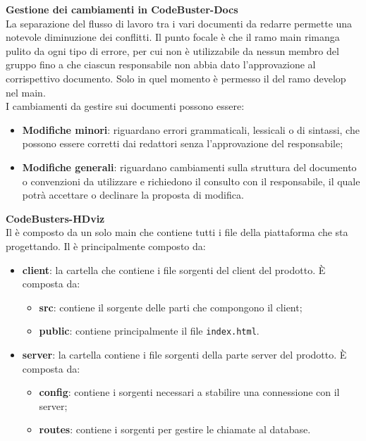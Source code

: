 \mbox{}	
	
\textbf{Gestione dei cambiamenti in CodeBuster-Docs}\\
La separazione del flusso di lavoro tra i vari documenti da redarre permette una notevole diminuzione dei conflitti. Il punto focale è che il ramo main rimanga pulito da ogni tipo di errore, per cui non è utilizzabile da nessun membro del gruppo fino a che ciascun responsabile non abbia dato l'approvazione al corrispettivo documento. Solo in quel momento è permesso il  del ramo develop nel main. \\
I cambiamenti da gestire sui documenti possono essere:
\begin{itemize}
	\item \textbf{Modifiche minori}: riguardano errori grammaticali, lessicali o di sintassi, che possono essere corretti dai redattori senza l'approvazione del responsabile;
	\item \textbf{Modifiche generali}: riguardano cambiamenti sulla struttura del documento o convenzioni da utilizzare e richiedono il consulto con il responsabile, il quale potrà accettare o declinare la proposta di modifica.
\end{itemize}

\mbox{}

\textbf{CodeBusters-HDviz}\\
Il  è composto da un solo  main che contiene tutti i file della piattaforma che \Gruppo{} sta progettando. Il  è principalmente composto da:
\begin{itemize}
	\item \textbf{client}: la cartella che contiene i file sorgenti del client del prodotto. È composta da:
	\begin{itemize}
		\item \textbf{src}: contiene il sorgente delle parti che compongono il client;
		\item \textbf{public}: contiene principalmente il file \texttt{index.html}.
	\end{itemize}
	\item \textbf{server}: la cartella contiene i file sorgenti della parte server del prodotto. È composta da:
	\begin{itemize}
		\item \textbf{config}: contiene i sorgenti necessari a stabilire una connessione con il server; 
		\item \textbf{routes}: contiene i sorgenti per gestire le chiamate al database.
	\end{itemize}
\end{itemize}

